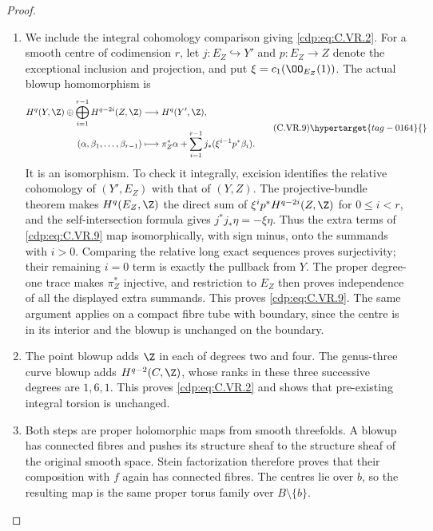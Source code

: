 \begin{proof}
\begin{enumerate}[label={$\langle1\rangle$\arabic*.},leftmargin=*]
\item We include the integral cohomology comparison giving \eqref{cdp:eq:C.VR.2}.
For a smooth centre of codimension $r$, let $j:E_Z\hookrightarrow Y'$
and $p:E_Z\to Z$ denote the exceptional inclusion and projection,
and put $\xi=c_1(\OO_{E_Z}(1))$. The actual blowup homomorphism is
\[
 \begin{split}
 H^q(Y,\Z)\oplus\bigoplus_{i=1}^{r-1}H^{q-2i}(Z,\Z)
   &\longrightarrow H^q(Y',\Z),\\
 (\alpha,\beta_1,\ldots,\beta_{r-1})
   &\longmapsto \pi_Z^*\alpha+
       \sum_{i=1}^{r-1}j_*(\xi^{i-1}p^*\beta_i).
 \end{split}                                      \tag{C.VR.9}\hypertarget{tag-0164}{}\label{cdp:eq:C.VR.9}
\]
It is an isomorphism. To check it integrally, excision identifies the
relative cohomology of $(Y',E_Z)$ with that of $(Y,Z)$. The
projective-bundle theorem makes $H^q(E_Z,\Z)$ the direct sum of
$\xi^i p^*H^{q-2i}(Z,\Z)$ for $0\le i<r$, and the self-intersection
formula gives $j^*j_*\eta=-\xi\eta$. Thus the extra terms of
\eqref{cdp:eq:C.VR.9} map isomorphically, with sign minus, onto the summands with
$i>0$. Comparing the relative long exact sequences proves
surjectivity; their remaining $i=0$ term is exactly the pullback from
$Y$. The proper degree-one trace makes $\pi_Z^*$ injective, and
restriction to $E_Z$ then proves independence of all the displayed
extra summands. This proves \eqref{cdp:eq:C.VR.9}. The same argument applies on a
compact fibre tube with boundary, since the centre is in its interior
and the blowup is unchanged on the boundary.

\item The point blowup adds $\Z$ in each of degrees two and four. The
genus-three curve blowup adds $H^{q-2}(C,\Z)$, whose ranks in these
three successive degrees are $1,6,1$. This proves \eqref{cdp:eq:C.VR.2} and shows
that pre-existing integral torsion is unchanged.

\item Both steps are proper holomorphic maps from smooth threefolds. A
blowup has connected fibres and pushes its structure sheaf to the
structure sheaf of the original smooth space. Stein factorization
therefore proves that their composition with $f$ again has connected
fibres. The centres lie over $b$, so the resulting map is the same
proper torus family over $B\setminus\{b\}$.


\end{enumerate}
\end{proof}
